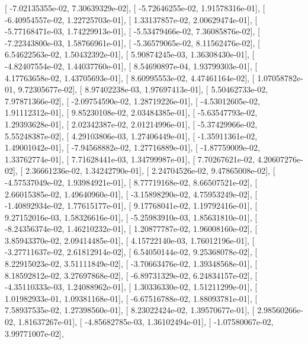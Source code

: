 \documentclass{article}
\begin{document}
       [ -7.02135355e-02,   7.30639329e-02],
       [ -5.72646255e-02,   1.91578316e-01],
       [ -6.40954557e-02,   1.22725703e-01],
       [  1.33137857e-02,   2.00629474e-01],
       [ -5.77168471e-03,   1.74229913e-01],
       [ -5.53479466e-02,   7.36085876e-02],
       [ -7.22343800e-03,   1.58766961e-01],
       [ -5.36579065e-02,   8.11562476e-02],
       [  6.54622563e-02,   1.50432392e-01],
       [  5.90874245e-03,   1.36308430e-01],
       [ -4.82407554e-02,   1.44037760e-01],
       [  8.54690897e-04,   1.93799303e-01],
       [  4.17763658e-02,   1.43705693e-01],
       [  8.60995553e-02,   4.47461164e-02],
       [  1.07058782e-01,   9.72305677e-02],
       [  8.97402238e-03,   1.97697413e-01],
       [  5.50462733e-02,   7.97871366e-02],
       [ -2.09754590e-02,   1.28719226e-01],
       [ -4.53012605e-02,   1.91112312e-01],
       [  9.85230108e-02,   2.03484385e-01],
       [ -5.63547793e-02,   1.29393628e-01],
       [  2.02342387e-02,   2.01214996e-01],
       [ -5.37429966e-02,   5.55248387e-02],
       [  4.29103806e-03,   1.27406449e-01],
       [ -1.35911361e-02,   1.49001042e-01],
       [ -7.94568882e-02,   1.27716889e-01],
       [ -1.87759009e-02,   1.33762774e-01],
       [  7.71628441e-03,   1.34799987e-01],
       [  7.70267621e-02,   4.20607276e-02],
       [  2.36661236e-02,   1.34242790e-01],
       [  2.24704526e-02,   9.47865008e-02],
       [ -4.57537049e-02,   1.93984921e-01],
       [  8.77719168e-02,   8.66507521e-02],
       [  2.66015385e-02,   1.49640960e-01],
       [ -3.15898290e-02,   4.75953249e-02],
       [ -1.40892934e-02,   1.77615177e-01],
       [  9.17768041e-02,   1.19792416e-01],
       [  9.27152016e-03,   1.58326616e-01],
       [ -5.25983910e-03,   1.85631810e-01],
       [ -8.24356374e-02,   1.46210232e-01],
       [  1.20877787e-02,   1.96008160e-02],
       [  3.85943370e-02,   2.09414485e-01],
       [  4.15722140e-03,   1.76012196e-01],
       [ -3.27711637e-02,   2.61812914e-02],
       [  6.54050144e-02,   9.25368078e-02],
       [  8.22915023e-02,   3.51111849e-02],
       [ -3.70663476e-02,   1.39348568e-01],
       [  8.18592812e-02,   3.27697868e-02],
       [ -6.89731329e-02,   6.24834157e-02],
       [ -4.35110333e-03,   1.24088962e-01],
       [  1.30336330e-02,   1.51211299e-01],
       [  1.01982933e-01,   1.09381168e-01],
       [ -6.67516788e-02,   1.88093781e-01],
       [  7.58937535e-02,   1.27398560e-01],
       [  8.23022424e-02,   1.39570677e-01],
       [  2.98560266e-02,   1.81637267e-01],
       [ -4.85682785e-03,   1.36102494e-01],
       [ -1.07580067e-02,   3.99771007e-02],
\end{document}
